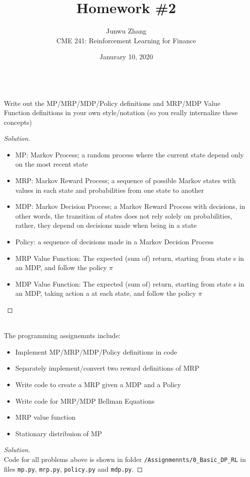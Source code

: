 \documentclass[12pt]{article}
\date{Janurary 10, 2020}
\newenvironment{problem}[2][Problem]{\begin{trivlist}
\item[\hskip \labelsep {\bfseries #1}\hskip \labelsep {\bfseries #2.}]}{\end{trivlist}}
\newenvironment{solution}
  {\renewcommand\qedsymbol{$\blacksquare$}\begin{proof}[Solution]}
  {\end{proof}}
\begin{document}
 
\title{Homework \#2}
\author{Junwu Zhang\\ 
CME 241: Reinforcement Learning for Finance}
 
\maketitle

\begin{problem}{1}
\text{ }\\
Write out the MP/MRP/MDP/Policy definitions and MRP/MDP Value Function definitions in your own style/notation (so you really internalize these concepts)
\end{problem}
\begin{solution}
\text{ }\\
\begin{itemize}[noitemsep]
	\item MP: Markov Process; a random process where the current state depend only on the most recent state
	\item MRP: Markov Reward Process; a sequence of possible Markov states with values in each state and probabilities from one state to another
	\item MDP: Markov Decision Process; a Markov Reward Process with decisions, in other words, the transition of states does not rely solely on probabilities, rather, they depend on decisions made when being in a state
	\item Policy: a sequence of decisions made in a Markov Decision Process
	\item MRP Value Function: The expected (sum of) return, starting from state s
	in an MDP, and follow the policy $\pi$
	\item MDP Value Function: The expected (sum of) return, starting from state s
	in an MDP, taking action a at each state, and follow the policy $\pi$
\end{itemize}
\end{solution}

\begin{problem}{2}
	\text{ }\\
	The programming assignemnts include:
	\begin{itemize}[noitemsep]
		\item Implement MP/MRP/MDP/Policy definitions in code
		\item Separately implement/convert two reward definitions of MRP
		\item Write code to create a MRP given a MDP and a Policy
		\item Write code for MRP/MDP Bellman Equations
		\item MRP value function
		\item Stationary distribuion of MP
	\end{itemize}
\end{problem}
\begin{solution}
	\text{ }\\
	Code for all problems above is shown in folder \verb|/Assignmennts/0_Basic_DP_RL| in files \verb|mp.py|, \verb|mrp.py|, \verb|policy.py| and \verb|mdp.py|.
\end{solution}
\end{document}
